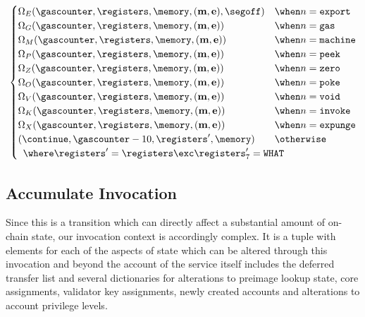 \begin{align}
\begin{cases}
      \Omega_E(\gascounter, \registers, \memory, (\mathbf{m}, \mathbf{e}), \segoff) &\when n = \mathtt{export}\\
      \Omega_G(\gascounter, \registers, \memory, (\mathbf{m}, \mathbf{e})) &\when n = \mathtt{gas}\\
      \Omega_M(\gascounter, \registers, \memory, (\mathbf{m}, \mathbf{e})) &\when n = \mathtt{machine}\\
      \Omega_P(\gascounter, \registers, \memory, (\mathbf{m}, \mathbf{e})) &\when n = \mathtt{peek}\\
      \Omega_Z(\gascounter, \registers, \memory, (\mathbf{m}, \mathbf{e})) &\when n = \mathtt{zero}\\
      \Omega_O(\gascounter, \registers, \memory, (\mathbf{m}, \mathbf{e})) &\when n = \mathtt{poke}\\
      \Omega_V(\gascounter, \registers, \memory, (\mathbf{m}, \mathbf{e})) &\when n = \mathtt{void}\\
      \Omega_K(\gascounter, \registers, \memory, (\mathbf{m}, \mathbf{e})) &\when n = \mathtt{invoke}\\
      \Omega_X(\gascounter, \registers, \memory, (\mathbf{m}, \mathbf{e})) &\when n = \mathtt{expunge}\\
      (\continue, \gascounter - 10, \registers', \memory) &\otherwise\\
      \multicolumn{2}{l}{\where \registers' = \registers \exc \registers'_7 = \mathtt{WHAT}}
    \end{cases}
\end{align}

\subsection{Accumulate Invocation}\label{sec:accumulateinvocation}

Since this is a transition which can directly affect a substantial amount of on-chain state, our invocation context is accordingly complex. It is a tuple with elements for each of the aspects of state which can be altered through this invocation and beyond the account of the service itself includes the deferred transfer list and several dictionaries for alterations to preimage lookup state, core assignments, validator key assignments, newly created accounts and alterations to account privilege levels.

